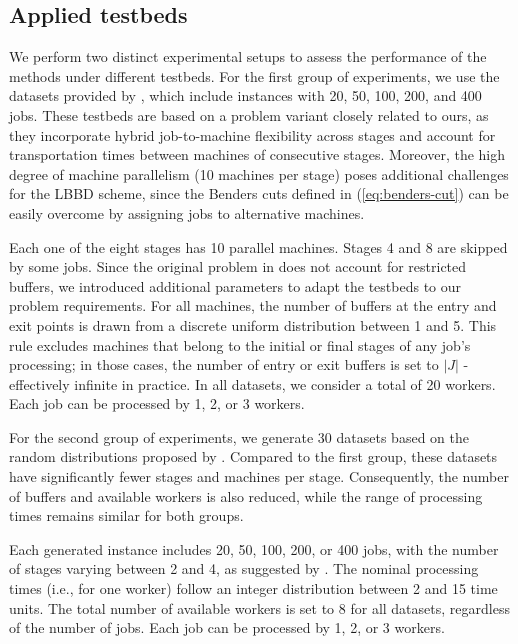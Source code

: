 \documentclass[a4paper,final]{article}
\begin{document}
    \subsection{Applied testbeds}
        We perform two distinct experimental setups to assess the performance of the methods under different testbeds. For the first group of experiments, we use the datasets provided by \cite{armstrong2021hybrid}, which include instances with 20, 50, 100, 200, and 400 jobs. These testbeds are based on a problem variant closely related to ours, as they incorporate hybrid job-to-machine flexibility across stages and account for transportation times between machines of consecutive stages. Moreover, the high degree of machine parallelism (10 machines per stage) poses additional challenges for the LBBD scheme, since the Benders cuts defined in (\ref{eq:benders-cut}) can be easily overcome by assigning jobs to alternative machines.
        
        Each one of the eight stages has 10 parallel machines. Stages 4 and 8 are skipped by some jobs. Since the original problem in \cite{armstrong2021hybrid} does not account for restricted buffers, we introduced additional parameters to adapt the testbeds to our problem requirements. For all machines, the number of buffers at the entry and exit points is drawn from a discrete uniform distribution between 1 and 5. This rule excludes machines that belong to the initial or final stages of any job's processing; in those cases, the number of entry or exit buffers is set to $|J|$ - effectively infinite in practice. In all datasets, we consider a total of 20 workers. Each job can be processed by 1, 2, or 3 workers.

        For the second group of experiments, we generate 30 datasets based on the random distributions proposed by \cite{naderi2014hybrid}. Compared to the first group, these datasets have significantly fewer stages and machines per stage. Consequently, the number of buffers and available workers is also reduced, while the range of processing times remains similar for both groups.

        Each generated instance includes 20, 50, 100, 200, or 400 jobs, with the number of stages varying between 2 and 4, as suggested by \cite{naderi2014hybrid}. The nominal processing times (i.e., for one worker) follow an integer distribution between 2 and 15 time units. The total number of available workers is set to 8 for all datasets, regardless of the number of jobs. Each job can be processed by 1, 2, or 3 workers.
\end{document}

